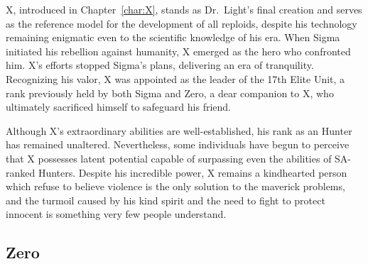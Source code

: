 X, introduced in Chapter~\ref{char:X}, stands as Dr.~Light's final creation and serves as the reference model for the development of all reploids, despite his technology remaining enigmatic even to the scientific knowledge of his era. When Sigma initiated his rebellion against humanity, X emerged as the hero who confronted him. X's efforts stopped Sigma's plans, delivering an era of tranquility. Recognizing his valor, X was appointed as the leader of the 17th Elite Unit, a rank previously held by both Sigma and Zero, a dear companion to X, who ultimately sacrificed himself to safeguard his friend.

Although X's extraordinary abilities are well-established, his rank as an Hunter has remained unaltered. Nevertheless, some individuals have begun to perceive that X possesses latent potential capable of surpassing even the abilities of SA-ranked Hunters. Despite his incredible power, X remains a kindhearted person which refuse to believe violence is the only solution to the maverick problems, and the turmoil caused by his kind spirit and the need to fight to protect innocent is something very few people understand\cite{Xcoll1:Manual_X2}.

\subsection{Zero}

